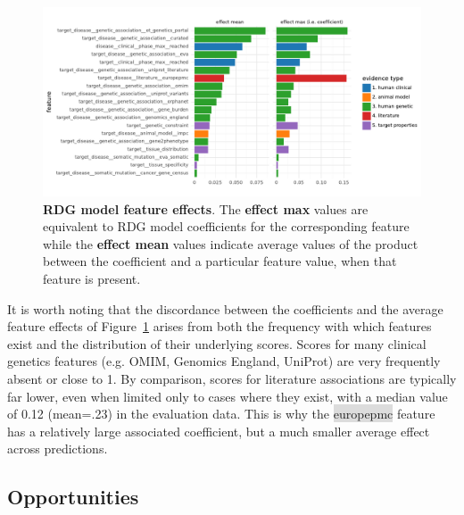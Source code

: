 \documentclass{article}
\begin{document}
\begin{figure}[!htb]
	\centering
  \captionsetup{width=.9\linewidth}
	\includegraphics[width=1\textwidth]{effect_sizes.pdf}
  \caption{
    \textbf{RDG model feature effects}. The \textbf{effect max} values are equivalent to RDG model coefficients for the corresponding feature while the \textbf{effect mean} values indicate average values of the product between the coefficient and a particular feature value, when that feature is present.
  }
	\label{fig:effect_sizes}
\end{figure}

It is worth noting that the discordance between the coefficients and the average feature effects of Figure~\ref{fig:effect_sizes} arises from both the frequency with which features exist and the distribution of their underlying scores. Scores for many clinical genetics features (e.g. OMIM, Genomics England, UniProt) are very frequently absent or close to 1. By comparison, scores for literature associations are typically far lower, even when limited only to cases where they exist, with a median value of 0.12 (mean=.23) in the evaluation data. This is why the \colorbox{Gainsboro}{europepmc} feature has a relatively large associated coefficient, but a much smaller average effect across predictions.


\subsection{Opportunities}
\label{sec:results_opportunities}
\end{document}
